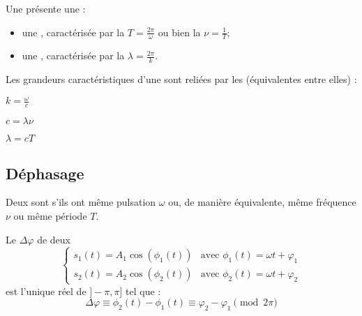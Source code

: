 \begin{propriete}
Une  présente une  :

\begin{itemize}
\item une , caractérisée par la  $T = \frac{2\pi}{\omega}$ ou bien la  $\nu = \frac{1}{T}$;

\item une , caractérisée par la  $\lambda = \frac{2\pi}{k}$.
\end{itemize}
\end{propriete}

\begin{propriete}
Les grandeurs caractéristiques d'une  sont reliées par les  (équivalentes entre elles) :

\begin{center}
\begin{enumerate*}[label=(\roman*), itemjoin=\qquad]
\item $k = \frac{\omega}{c}$
\item $c = \lambda \nu$
\item $\lambda = cT$
\end{enumerate*}
\end{center}
\end{propriete}



\subsection{Déphasage}

\begin{definition}
Deux  sont  s'ils ont même pulsation $\omega$ ou, de manière équivalente, même fréquence $\nu$ ou même période $T$.
\end{definition}

\begin{definition}
Le  $\Delta\varphi$ de deux 
\[\begin{cases}
s_1(t) = A_1 \cos(\phi_1(t)) & \text{avec } \phi_1(t) = \omega t + \varphi_1\\
s_2(t) = A_2 \cos(\phi_2(t)) & \text{avec } \phi_2(t) = \omega t + \varphi_2
\end{cases}\]
est l'unique réel de $]-\pi, \pi]$ tel que :
\[\Delta\varphi \equiv \phi_2(t) - \phi_1(t) \equiv \varphi_2 - \varphi_1 \pmod{2\pi}\]
\end{definition}

